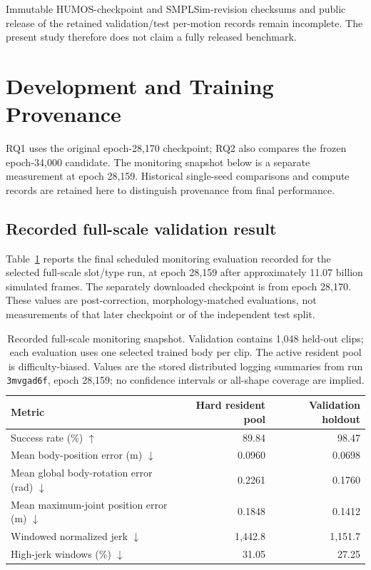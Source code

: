 \documentclass[11pt]{article}
\begin{document}
Immutable HUMOS-checkpoint and SMPLSim-revision checksums and public release
of the retained validation/test per-motion records remain incomplete. The
present study therefore does not claim a fully released benchmark.

\section{Development and Training Provenance}\label{app:history}
RQ1 uses the original epoch-28,170 checkpoint; RQ2 also compares the frozen
epoch-34,000 candidate. The monitoring
snapshot below is a separate measurement at epoch 28,159. Historical
single-seed comparisons and compute records are retained here to distinguish
provenance from final performance.
\subsection{Recorded full-scale validation result}\label{sec:full_results}

Table~\ref{tab:full_results} reports the final scheduled monitoring evaluation
recorded for the selected full-scale slot/type run, at epoch 28,159 after
approximately 11.07 billion simulated frames. The separately downloaded
checkpoint is from epoch 28,170. These values are post-correction,
morphology-matched evaluations, not measurements of that later checkpoint
or of the independent test split.

\begin{table}[t]
\centering
\small
\caption{Recorded full-scale monitoring snapshot. Validation contains
1,048 held-out clips; each evaluation uses one selected trained body per clip.
The active resident pool is difficulty-biased. Values are the stored
distributed logging summaries from run \texttt{3mvgad6f}, epoch 28,159;
no confidence intervals or all-shape coverage are implied.}\label{tab:full_results}
\begin{tabular}{lrr}
\toprule
Metric & Hard resident pool & Validation holdout \\
\midrule
Success rate (\%) $\uparrow$ & 89.84 & 98.47 \\
Mean body-position error (m) $\downarrow$ & 0.0960 & 0.0698 \\
Mean global body-rotation error (rad) $\downarrow$ & 0.2261 & 0.1760 \\
Mean maximum-joint position error (m) $\downarrow$ & 0.1848 & 0.1412 \\
Windowed normalized jerk $\downarrow$ & 1,442.8 & 1,151.7 \\
High-jerk windows (\%) $\downarrow$ & 31.05 & 27.25 \\
\bottomrule
\end{tabular}
\end{table}
\end{document}
